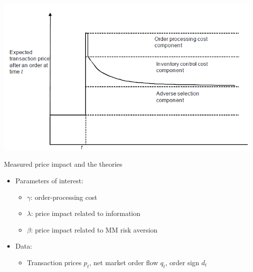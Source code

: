 \documentclass[english,10pt]{beamer}
\begin{document}
\begin{frame}{}
	\includegraphics[width=0.8\linewidth]{pics/PriceDiscovery_Image}
\end{frame}


\begin{frame}[label=theory]{Measured price impact and the theories}
	\begin{itemize}
		\item Parameters of interest:
		\begin{itemize}
			\item $\gamma$: order-processing cost
			\item $\lambda$: price impact related to information
			\item $\beta$: price impact related to MM risk aversion
		\end{itemize}
		\item Data:
		\begin{itemize}
			\item Transaction prices $p_t$, net market order flow $q_t$, order sign $d_t$
		\end{itemize}
	\end{itemize}
	\hyperlink{example}{}
\end{frame}
\end{document}
